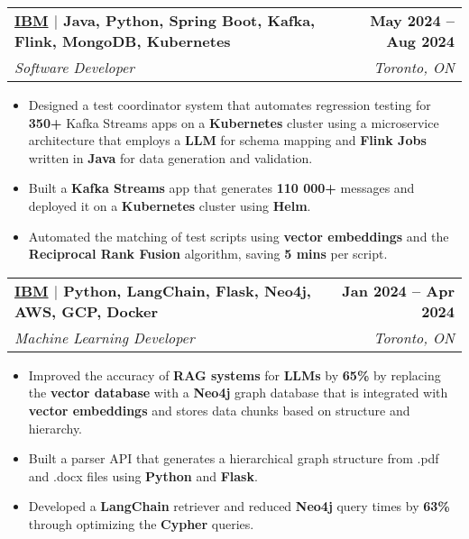 \documentclass[letterpaper,11pt]{article}
\makeatletter
\newcommand{\resumeItem}[1]{
  \item\small{
    {#1 \vspace{-3pt}}
  }
}
\newcommand{\resumeSubheading}[4]{
  \vspace{-2pt}\item
    \begin{tabular*}{1.0\textwidth}[t]{l@{\extracolsep{\fill}}r}
      \textbf{#1} & \textbf{\small #2} \\
      \textit{\small#3} & \textit{\small #4} \\
    \end{tabular*}\vspace{-7pt}
}
\newcommand{\resumeItemListStart}{\begin{itemize}[leftmargin=0.2in]}
\newcommand{\resumeItemListEnd}{\end{itemize}\vspace{-5pt}}
\makeatother
\begin{document}
    \resumeSubheading
      {{\href{https://www.ibm.com/ca-en}{\textcolor{NavyBlue}{IBM}}} $|$ \textnormal{Java, Python, Spring Boot, Kafka, Flink, MongoDB, Kubernetes}}{May 2024 -- Aug 2024}
      {Software Developer}{Toronto, ON}
      \resumeItemListStart
        \resumeItem{Designed a test coordinator system that automates regression testing for \textbf{350+} Kafka Streams apps on a \textbf{Kubernetes} cluster using a microservice architecture that employs a \textbf{LLM} for schema mapping and \textbf{Flink Jobs} written in \textbf{Java} for data generation and validation.}
        \resumeItem{Built a \textbf{Kafka Streams} app that generates \textbf{110 000+} messages and deployed it on a \textbf{Kubernetes} cluster using \textbf{Helm}.}
        \resumeItem{Automated the matching of test scripts using \textbf{vector embeddings} and the \textbf{Reciprocal Rank Fusion} algorithm, saving \textbf{5 mins} per script.}
      \resumeItemListEnd


    \resumeSubheading
      {{\href{https://www.ibm.com/ca-en}{\textcolor{NavyBlue}{IBM}}} $|$ \textnormal{Python, LangChain, Flask, Neo4j, AWS, GCP, Docker}}{Jan 2024 -- Apr 2024}
      {Machine Learning Developer}{Toronto, ON}
      \resumeItemListStart
        \resumeItem{Improved the accuracy of \textbf{RAG systems} for \textbf{LLMs} by \textbf{65\%} by replacing the \textbf{vector database} with a \textbf{Neo4j} graph database that is integrated with \textbf{vector embeddings} and stores data chunks based on structure and hierarchy.}
        \resumeItem{Built a parser API that generates a hierarchical graph structure from .pdf and .docx files using \textbf{Python} and \textbf{Flask}.}
        \resumeItem{Developed a \textbf{LangChain} retriever and reduced \textbf{Neo4j} query times by \textbf{63\%} through optimizing the \textbf{Cypher} queries.}
      \resumeItemListEnd
\end{document}

